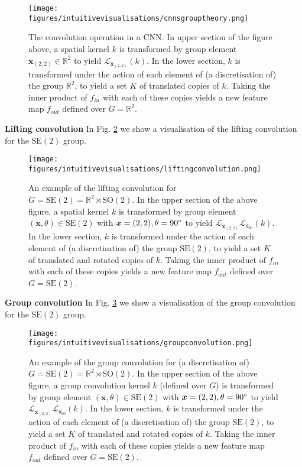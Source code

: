 \documentclass[nohyperref]{article}
\theoremstyle{plain}
\theoremstyle{definition}
\theoremstyle{remark}
\begin{document}
\begin{figure}
\centering
\texttt{[image: figures/intuitivevisualisations/cnnsgrouptheory.png]}
\caption[CNNs from a group theoretic perspective]{The convolution operation in a CNN. In upper section of the figure above, a spatial kernel $k$ is transformed by group element $\boldsymbol{x}_{(2, 2)}\in \mathbb{R}^2$ to yield $\mathcal{L}_{\boldsymbol{x}_{(2,2)}}(k)$. In the lower section, $k$ is transformed under the action of each element of (a discretisation of) the group $\mathbb{R}^2$, to yield a set $K$ of translated copies of $k$. Taking the inner product of $f_{in}$ with each of these copies yields a new feature map $f_{out}$ defined over $G=\mathbb{R}^2$.}
\label{fig:cnnsgrouptheory}
\end{figure}

\textbf{Lifting convolution} In Fig. \ref{fig:liftingconv} we show a visualisation of the lifting convolution for the $\mathrm{SE(2)}$ group.

\begin{figure}
\centering
\texttt{[image: figures/intuitivevisualisations/liftingconvolution.png]}
\caption[Lifting Convolution]{An example of the lifting convolution for $G=\mathrm{SE(2)}=\mathbb{R}^2\rtimes \mathrm{SO(2)}$. In the upper section of the above figure, a spatial kernel $k$ is transformed by group element $(\boldsymbol{x}, \theta) \in \mathrm{SE(2)}$ with $\boldsymbol{x}=(2,2),\theta=90\degree$ to yield $\mathcal{L}_{\boldsymbol{x}_{(2,2)}}\mathcal{L}_{\theta_{90}}(k)$. In the lower section, $k$ is transformed under the action of each element of (a discretisation of) the group $\mathrm{SE(2)}$, to yield a set $K$ of translated and rotated copies of $k$. Taking the inner product of $f_{in}$ with each of these copies yields a new feature map $f_{out}$ defined over $G=\mathrm{SE(2)}$.}
\label{fig:liftingconv}
\end{figure}

\textbf{Group convolution} In Fig. \ref{fig:groupconv} we show a visualisation of the group convolution for the $\mathrm{SE(2)}$ group.

\begin{figure}
\centering
\texttt{[image: figures/intuitivevisualisations/groupconvolution.png]}
\caption[Group Convolution]{An example of the group convolution for (a discretisation of) $G=\mathrm{SE(2)}=\mathbb{R}^2\rtimes \mathrm{SO(2)}$. In the upper section of the above figure, a group convolution kernel $k$ (defined over $G$) is transformed by group element $(\boldsymbol{x}, \theta) \in \mathrm{SE(2)}$ with $\boldsymbol{x}=(2,2),\theta=90\degree$ to yield $\mathcal{L}_{\boldsymbol{x}_{(2,2)}}\mathcal{L}_{\theta_{90}}(k)$. In the lower section, $k$ is transformed under the action of each element of (a discretisation of) the group $\mathrm{SE(2)}$, to yield a set $K$ of translated and rotated copies of $k$. Taking the inner product of $f_{in}$ with each of these copies yields a new feature map $f_{out}$ defined over $G=\mathrm{SE(2)}$.}
\label{fig:groupconv}
\end{figure}
\end{document}
